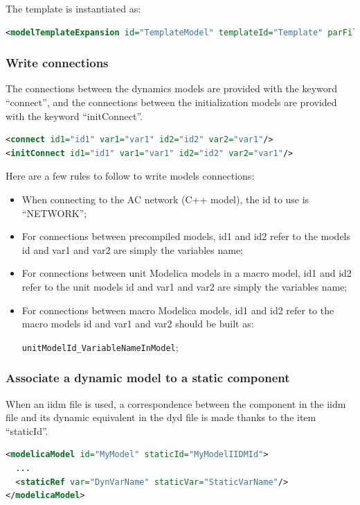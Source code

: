 \documentclass[a4paper, 12pt]{report}
\begin{document}
The template is instantiated as:
\begin{lstlisting}[language=XML,numbers=none]
<modelTemplateExpansion id="TemplateModel" templateId="Template" parFile="MyPar.par" parId="6">
\end{lstlisting}

\subsubsection{Write connections}

The connections between the dynamics models are provided with the keyword ``connect'', and the connections between the initialization models are provided with the keyword ``initConnect''.
\begin{lstlisting}[language=XML]
<connect id1="id1" var1="var1" id2="id2" var2="var1"/>
<initConnect id1="id1" var1="var1" id2="id2" var2="var1"/>
\end{lstlisting}

Here are a few rules to follow to write models connections:
\begin{itemize}
\item When connecting to the AC network (C++ model), the id to use is ``NETWORK'';
\item For connections between precompiled models, id1 and id2 refer to the models id and var1 and var2 are simply the variables name;
\item For connections between unit Modelica models in a macro model, id1 and id2 refer to the unit models id and var1 and var2 are simply the variables name;
\item For connections between macro Modelica models, id1 and id2 refer to the macro models id and var1 and var2 should be built as:

\verb|unitModelId_VariableNameInModel|;
\end{itemize}

\subsubsection{Associate a dynamic model to a static component}

When an iidm file is used, a correspondence between the component in the iidm file and its dynamic equivalent in the dyd file is made thanks to the item ``staticId''.
\begin{lstlisting}[language=XML, morekeywords={staticId}]
<modelicaModel id="MyModel" staticId="MyModelIIDMId">
  ...
  <staticRef var="DynVarName" staticVar="StaticVarName"/>
</modelicaModel>
\end{lstlisting}
\end{document}
